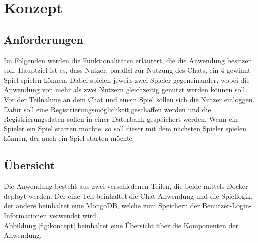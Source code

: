 
\chapter{Konzept}\label{cha:Konzept}
\section{Anforderungen}\label{sec:Anforderungen}
Im Folgenden werden die Funktionalitäten erläutert, die die Anwendung besitzen soll. Hauptziel ist es, dass Nutzer, parallel zur Nutzung des Chats, ein 4-gewinnt-Spiel spielen können. Dabei spielen jeweils zwei Spieler gegeneinander, wobei die Anwendung von mehr als zwei Nutzern gleichzeitig genutzt werden können soll. Vor der Teilnahme an dem Chat und einem Spiel sollen sich die Nutzer einloggen. Dafür soll eine Registrierungsmöglichkeit geschaffen werden und die Registrierungsdaten sollen in einer Datenbank gespeichert werden. Wenn ein Spieler ein Spiel starten möchte, so soll dieser mit dem nächsten Spieler spielen können, der auch ein Spiel starten möchte.
\section{Übersicht}\label{sec:Übersicht}
Die Anwendung besteht aus zwei verschiedenen Teilen, die beide mittels Docker deployt werden. 
Der eine Teil beinhaltet die Chat-Anwendung und die Spiellogik, der andere beinhaltet eine MongoDB, welche zum Speichern der Benutzer-Login-Informationen verwendet wird.\\
Abbildung \ref{fig:koncept} beinhaltet eine Übersicht über die Komponenten der Anwendung.

